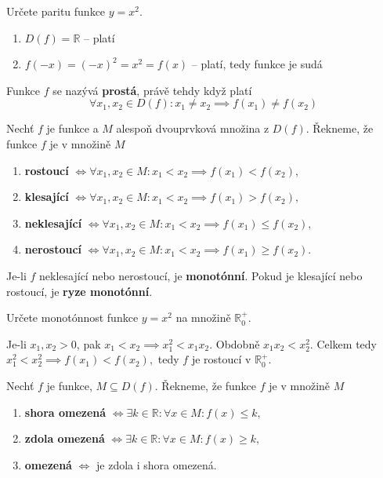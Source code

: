 \begin{priklad}
Určete paritu funkce $y=x^2$.
\end{priklad}

\begin{reseni}
\begin{enumerate}[1.]
\item $D(f)=\mathbb R$ -- platí
\item $f(-x)=(-x)^2=x^2=f(x)$ -- platí, tedy funkce je sudá
\end{enumerate}
\end{reseni}

\begin{definition}
  Funkce $f$ se nazývá \textbf{prostá}, právě tehdy když platí
  \[
    \forall x_1,x_2\in D(f): x_1\ne x_2 \implies f(x_1)\ne f(x_2)
  \]
\end{definition}

\begin{definition}
  Nechť $f$ je funkce a $M$ alespoň dvouprvková množina z $D(f)$. Řekneme, že funkce $f$ je v množině $M$
  \begin{enumerate}[$i.$]
    \item \textbf{rostoucí} $\iff \forall x_1, x_2 \in M: x_1 < x_2 \implies f(x_1) < f(x_2),$
    \item \textbf{klesající} $\iff \forall x_1, x_2 \in M: x_1 < x_2 \implies f(x_1) > f(x_2),$
    \item \textbf{neklesající} $\iff \forall x_1, x_2 \in M: x_1 < x_2 \implies f(x_1) \leq f(x_2),$
    \item \textbf{nerostoucí} $\iff \forall x_1, x_2 \in M: x_1 < x_2 \implies f(x_1) \geq f(x_2).$
  \end{enumerate}
  Je-li $f$ neklesající nebo nerostoucí, je \textbf{monotónní}. Pokud je klesající nebo rostoucí, je \textbf{ryze monotónní}.
\end{definition}

\begin{priklad}
Určete monotónnost funkce $y=x^2$ na množině $\mathbb R_0^+.$
\end{priklad}
\begin{reseni}
Je-li $x_1,x_2 >0$, pak $x_1 < x_2 \implies x_1^2 < x_1x_2.$ Obdobně $x_1x_2<x_2^2$.
Celkem tedy $x_1^2<x_2^2 \implies f(x_1)<f(x_2),$ tedy $f$ je rostoucí v $\mathbb R_0^+.$
\end{reseni}

\begin{definition}
  Nechť $f$ je funkce, $M\subseteq D(f)$. Řekneme, že funkce $f$ je v množině $M$
  \begin{enumerate}[$i.$]
    \item \textbf{shora omezená} $\iff \exists k \in \mathbb R: \forall x \in M: f(x)\leq k,$
    \item \textbf{zdola omezená} $\iff \exists k \in \mathbb R: \forall x \in M: f(x)\geq k,$
    \item \textbf{omezená} $\iff $ je zdola i shora omezená.
  \end{enumerate}
\end{definition}

